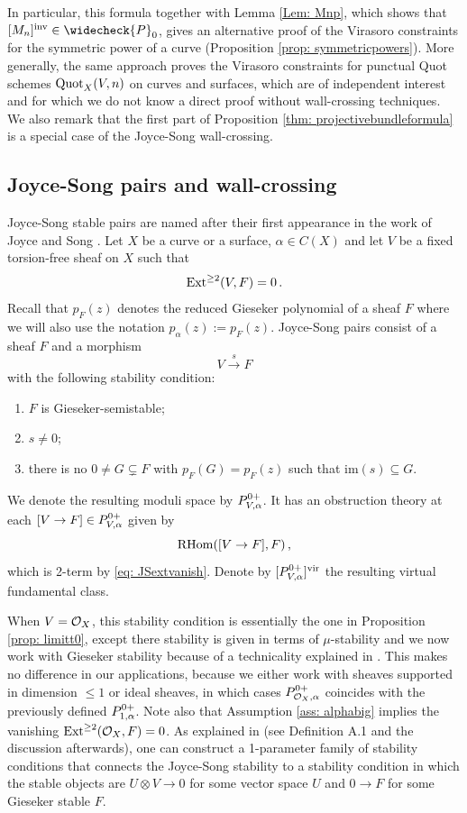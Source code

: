 \documentclass[a4paper, 12pt]{amsart}
\begin{document}
\begin{appendices}
In particular, this formula together with Lemma \ref{Lem: Mnp}, which shows that $[M_{n}]^\inva\in \widecheck{P}_0$, gives an alternative proof of the Virasoro constraints for the symmetric power of a curve (Proposition \ref{prop: symmetricpowers}). More generally, the same approach proves the Virasoro constraints for punctual Quot schemes $\text{Quot}_X(V,n)$ on curves and surfaces, which are of independent interest and for which we do not know a direct proof without wall-crossing techniques. We also remark that the first part of Proposition \ref{thm: projectivebundleformula} is a special case of the Joyce-Song wall-crossing.


\subsection{Joyce-Song pairs and wall-crossing}

\label{sec: joycesong}
Joyce-Song stable pairs are named after their first appearance in the work of Joyce and Song \cite[Section 12.1]{JS12}. Let $X$ be a curve or a surface, $\alpha\in C(X)$ and let $V$ be a fixed torsion-free sheaf on $X$ such that 
\begin{equation}\label{eq: JSextvanish}
\textup{Ext}^{\geq 2}(V,F)=0\,.
\end{equation}
Recall that $p_F(z)$ denotes the reduced Gieseker polynomial of a sheaf $F$ where we will also use the notation $p_{\alpha}(z):=p_F(z)$. Joyce-Song pairs consist of a sheaf $F$ and a morphism
$$
V \xrightarrow{s} F
$$
with the following stability condition:
\begin{enumerate}
    \item $F$ is Gieseker-semistable;
    \item $s\neq 0$; 
    \item there is no $0\neq G\subsetneq F$ with $p_F(G)=p_F(z)$ such that $\mathrm{im}(s)\subseteq G$.
\end{enumerate}

We denote the resulting moduli space by $P^{0+}_{V,\alpha}$. It has an obstruction theory at each $[V\to F]\in P^{0+}_{V,\alpha}$ given by
$$
\mathrm{RHom}([V\to F], F)\,,
$$
which is 2-term by \eqref{eq: JSextvanish}. Denote by
$[P^{0+}_{V,\alpha}]^{\mathrm{vir}}$ the resulting virtual fundamental class. 


When $V={\mathcal O}_X$, this stability condition is essentially the one in Proposition \ref{prop: limitt0}, except there stability is given in terms of $\mu$-stability and we now work with Gieseker stability because of a technicality explained in \cite[Rem. A.3]{Bo21.5}. This makes no difference in our applications, because we either work with sheaves supported in dimension $\leq 1$ or ideal sheaves, in which cases $P^{0+}_{{\mathcal O}_X, \alpha}$ coincides with the previously defined $P^{0+}_{1,\alpha}$. Note also that Assumption \ref{ass: alphabig} implies the vanishing $\textup{Ext}^{\geq 2}({\mathcal O}_X,F)=0$. As explained in \cite{Bo21.5} (see Definition A.1 and the discussion afterwards), one can construct a 1-parameter family of stability conditions that connects the Joyce-Song stability to a stability condition in which the stable objects are $U\otimes V\to 0$ for some vector space $U$ and $0\to F$ for some Gieseker stable $F$. 


\end{appendices}
\end{document}
